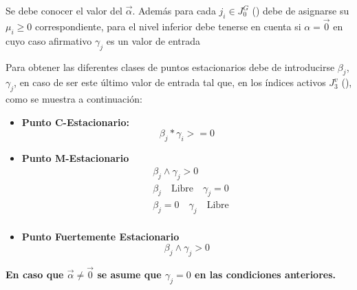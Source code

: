 Se debe conocer el valor del $\vec{\alpha}$. 
Además para cada $j_i \in J_0^G$ () debe de asignarse su $\mu_i \geq 0$ correspondiente,
para el nivel inferior debe tenerse en cuenta si $\alpha=\vec{0}$ en cuyo caso afirmativo $\gamma_j$ es un valor de entrada

Para obtener las diferentes clases de puntos estacionarios debe de introducirse $\beta_j$, $\gamma_j$, en caso de ser este último valor de entrada tal que, en los índices activos $J_3^v$ (), como se muestra a continuación: 
\begin{itemize}
    \item \textbf{Punto C-Estacionario:}\\
    \begin{equation}
        \beta_j * \gamma_i >=0
        \label{Requisitos puntos C-Estacionario}
    \end{equation}
    \item \textbf{Punto M-Estacionario}\\
    \begin{equation}
        \begin{aligned}
            &\beta_j \land \gamma_j>0\\
            &\beta_j \quad \text{Libre} \quad \gamma_j=0\\
            &\beta_j=0 \quad \gamma_j \quad \text{Libre}\\
        \end{aligned}
        \label{Requisitos puntos M-Estacionarios}
    \end{equation}
    \item \textbf{Punto Fuertemente Estacionario}\\
     \begin{equation}
        \beta_j \land \gamma_j >0
    \label{Requisitos puntos Fuertemente Estacionarios}
    \end{equation}    
\end{itemize}
\textbf{En caso que $\vec{\alpha} \neq \vec{0}$ se asume que $\gamma_j=0$ en las condiciones anteriores.}

